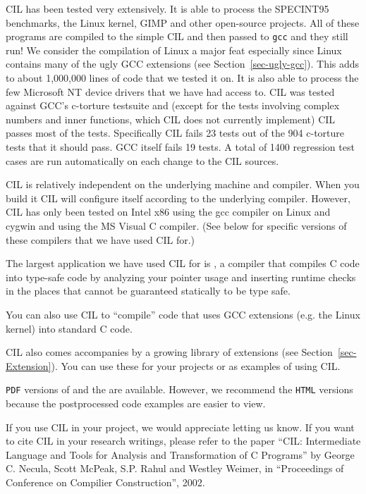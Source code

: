 \documentclass{article}
\def\secref#1{Section~\ref{sec-#1}}
\def\t#1{{\tt #1}}
\newcommand\ahreftop[2]{{\ahref{javascript:loadTop('#1')}{#2}}}
\begin{document}
 CIL has been tested very extensively. It is able to process the SPECINT95
benchmarks, the Linux kernel, GIMP and other open-source projects. All of
these programs are compiled to the simple CIL and then passed to \t{gcc} and
they still run! We consider the compilation of Linux a major feat especially
since Linux contains many of the ugly GCC extensions (see \secref{ugly-gcc}).
This adds to about 1,000,000 lines of code that we tested it on. It is also
able to process the few Microsoft NT device drivers that we have had access
to. CIL was tested against GCC's c-torture testsuite and (except for the tests
involving complex numbers and inner functions, which CIL does not currently
implement) CIL passes most of the tests. Specifically CIL fails 23 tests out
of the 904 c-torture tests that it should pass. GCC itself fails 19 tests. A
total of 1400 regression test cases are run automatically on each change to
the CIL sources.

 CIL is relatively independent on the underlying machine and compiler. When
you build it CIL will configure itself according to the underlying compiler.
However, CIL has only been tested on Intel x86 using the gcc compiler on Linux
and cygwin and using the MS Visual C compiler. (See below for specific
versions of these compilers that we have used CIL for.)

 The largest application we have used CIL for is
\ahreftop{../ccured/index.html}{CCured}, a compiler that compiles C code into
type-safe code by analyzing your pointer usage and inserting runtime checks in
the places that cannot be guaranteed statically to be type safe.  

 You can also use CIL to ``compile'' code that uses GCC extensions (e.g. the
Linux kernel) into standard C code.

 CIL also comes accompanies by a growing library of extensions (see
\secref{Extension}). You can use these for your projects or as examples of
using CIL. 

\t{PDF} versions of  and the
 are available. However, we recommend the
\t{HTML} versions because the postprocessed code examples are easier to
view. 

 If you use CIL in your project, we would appreciate letting us know. If you
want to cite CIL in your research writings, please refer to the paper ``CIL:
Intermediate Language and Tools for Analysis and Transformation of C
Programs'' by George C. Necula, Scott McPeak, S.P. Rahul and Westley Weimer,
in ``Proceedings of Conference on Compilier Construction'', 2002.
\end{document}
